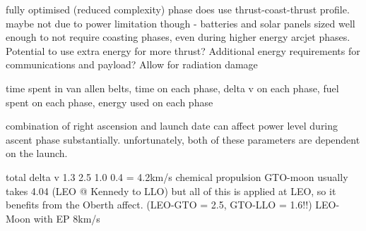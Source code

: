 fully optimised (reduced complexity) phase does use thrust-coast-thrust profile. maybe not due to power limitation though - batteries and solar panels sized well enough to not require coasting phases, even during higher energy arcjet phases. Potential to use extra energy for more thrust? Additional energy requirements for communications and payload? Allow for radiation damage


time spent in van allen belts, time on each phase, delta v on each phase, fuel spent on each phase, energy used on each phase

combination of right ascension and launch date can affect power level during ascent phase substantially. unfortunately, both of these parameters are dependent on the launch.


total delta v 
1.3 2.5 1.0 0.4 = 4.2km/s
chemical propulsion GTO-moon usually takes 4.04 (LEO @ Kennedy to LLO) but all of this is applied at LEO, so it benefits from the Oberth affect. (LEO-GTO = 2.5, GTO-LLO = 1.6!!)
LEO-Moon with EP 8km/s